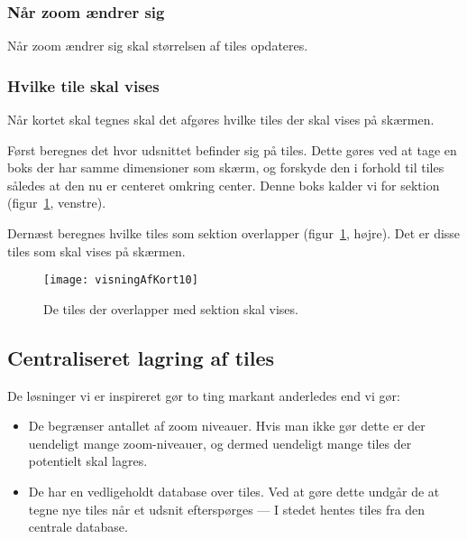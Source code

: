 \subsubsection{Når zoom ændrer sig}
\label{subsec:naarZoomAendrerSig}

Når zoom ændrer sig skal størrelsen af tiles opdateres.

\subsubsection{Hvilke tile skal vises}
\label{subsec:hvilkeTilesSkalVises}

Når kortet skal tegnes skal det afgøres hvilke tiles der skal vises på skærmen.

Først beregnes det hvor udsnittet befinder sig på tiles. Dette gøres ved at tage en boks der har samme dimensioner som skærm, og forskyde den i forhold til tiles således at den nu er centeret omkring center. Denne boks kalder vi for sektion (figur~\ref{figur:visningAfKort10}, venstre).

Dernæst beregnes hvilke tiles som sektion overlapper (figur~\ref{figur:visningAfKort10}, højre). Det er disse tiles som skal vises på skærmen.

\begin{figure}[h]
	\centering
	\texttt{[image: visningAfKort10]}
	\captionsetup{width=0.8\textwidth}
	\caption{De tiles der overlapper med sektion skal vises.}
	\label{figur:visningAfKort10}
\end{figure}

\subsection{Centraliseret lagring af tiles}
\label{subsec:centraliseretLagringAfTiles}

De løsninger vi er inspireret gør to ting markant anderledes end vi gør:

\begin{itemize}
	\item De begrænser antallet af zoom niveauer. Hvis man ikke gør dette er der uendeligt mange zoom-niveauer, og dermed uendeligt mange tiles der potentielt skal lagres.
	\item De har en vedligeholdt database over tiles. Ved at gøre dette undgår de at tegne nye tiles når et udsnit efterspørges --- I stedet hentes tiles fra den centrale database.
\end{itemize}

